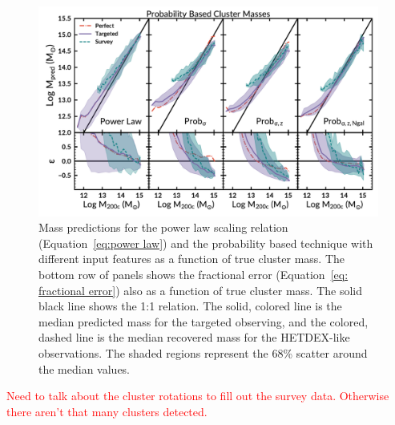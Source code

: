 \documentclass[fleqn,usenatbib]{mnras}
\newcommand{\editorial}[1]{\textcolor{red}{#1}}
\begin{document}
\begin{figure} 
	\includegraphics[width=\textwidth]{figures/Probcomparison.pdf} 
	\caption{Mass predictions for the power law scaling relation (Equation~\ref{eq:power law}) and the probability based technique with different input features as a function of true cluster mass. The bottom row of panels shows the fractional error (Equation~\ref{eq: fractional error}) also as a function of true cluster mass. The solid black line shows the 1:1 relation. The solid, colored line is the median predicted mass for the targeted observing, and the colored, dashed line is the median recovered mass for the HETDEX-like observations. The shaded regions represent the 68\% scatter around the median values.} \label{fig:Probability comparison} 
\end{figure}

\editorial{Need to talk about the cluster rotations to fill out the survey data. Otherwise there aren't that many clusters detected.} 
\end{document}
